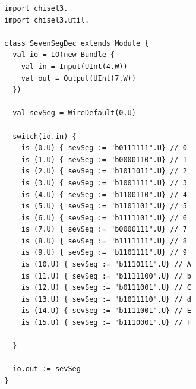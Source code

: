 \begin{lstlisting}
import chisel3._
import chisel3.util._

class SevenSegDec extends Module {
  val io = IO(new Bundle {
    val in = Input(UInt(4.W))
    val out = Output(UInt(7.W))
  })

  val sevSeg = WireDefault(0.U)

  switch(io.in) {
    is (0.U) { sevSeg := "b0111111".U} // 0
    is (1.U) { sevSeg := "b0000110".U} // 1
    is (2.U) { sevSeg := "b1011011".U} // 2
    is (3.U) { sevSeg := "b1001111".U} // 3
    is (4.U) { sevSeg := "b1100110".U} // 4
    is (5.U) { sevSeg := "b1101101".U} // 5
    is (6.U) { sevSeg := "b1111101".U} // 6
    is (7.U) { sevSeg := "b0000111".U} // 7
    is (8.U) { sevSeg := "b1111111".U} // 8
    is (9.U) { sevSeg := "b1101111".U} // 9
    is (10.U) { sevSeg := "b1110111".U} // A
    is (11.U) { sevSeg := "b1111100".U} // b
    is (12.U) { sevSeg := "b0111001".U} // C
    is (13.U) { sevSeg := "b1011110".U} // d
    is (14.U) { sevSeg := "b1111001".U} // E
    is (15.U) { sevSeg := "b1110001".U} // F
    
  }

  io.out := sevSeg
}



\end{lstlisting}